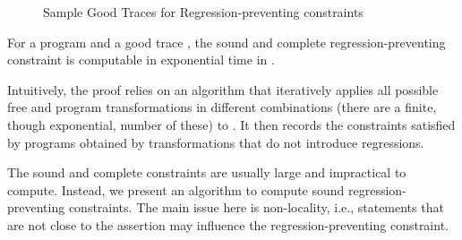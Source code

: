 \documentclass{llncs}
\newcommand\comment[1]{}
\newcommand\arsays[1]{{\bf AR: #1}}
\begin{document}
\begin{figure}[b]
{\begin{subfloatrow}[3]
{
    }
    {\vspace{-2ex}\subcaption{} \label{fig:write_order_trace}}
    \end{subfloatrow}
}
{
  \vspace{-2ex}
\caption{Sample Good Traces for Regression-preventing constraints}\label{fig:traces}
}
\end{figure}

\begin{lemma}
  \label{lem:learning_completeness}
  For a program  and a good trace , the sound and
  complete regression-preventing constraint  is computable
  in exponential time in .
\end{lemma}
Intuitively, the proof relies on an algorithm 
that iteratively applies all possible free
and program transformations in different combinations (there are a
finite, though exponential, number of these) to .
It then records the constraints satisfied by programs obtained by
transformations that do not introduce regressions. 

\comment{
While the complexity is exponential, we can
show that this cost is unavoidable.
We do not present the proof here, but only state that
it is non-constructive and is based on Shannon's lower bounds on
circuit complexity for boolean functions.
\arsays{This is a bit shady: is there a family of boolean functions that
has poly size circuits/poly size turing machines, but a exponential size
formulae}
\begin{lemma}
  There exist a class of programs , and traces  of
  length  such that the most-general regression-preventing
  constraint is of size .
\end{lemma}
}



The sound and complete constraints are usually large and
impractical to compute.
Instead, we present an algorithm to compute sound
regression-preventing constraints.
The main issue here is non-locality, i.e., statements that are not close
to the assertion may influence the regression-preventing constraint.
\end{document}
